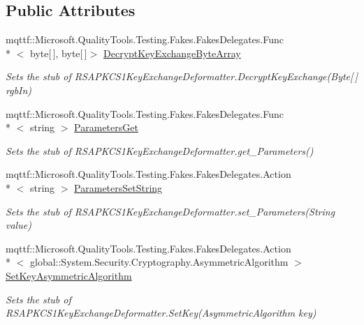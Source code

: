 \subsection*{Public Attributes}
\begin{DoxyCompactItemize}
\item 
mqttf\-::\-Microsoft.\-Quality\-Tools.\-Testing.\-Fakes.\-Fakes\-Delegates.\-Func\\*
$<$ byte\mbox{[}$\,$\mbox{]}, byte\mbox{[}$\,$\mbox{]}$>$ \hyperlink{class_system_1_1_security_1_1_cryptography_1_1_fakes_1_1_stub_r_s_a_p_k_c_s1_key_exchange_deformatter_ad2425a4b2fac6c6d558abbca82806171}{Decrypt\-Key\-Exchange\-Byte\-Array}
\begin{DoxyCompactList}\small\item\em Sets the stub of R\-S\-A\-P\-K\-C\-S1\-Key\-Exchange\-Deformatter.\-Decrypt\-Key\-Exchange(\-Byte\mbox{[}$\,$\mbox{]} rgb\-In)\end{DoxyCompactList}\item 
mqttf\-::\-Microsoft.\-Quality\-Tools.\-Testing.\-Fakes.\-Fakes\-Delegates.\-Func\\*
$<$ string $>$ \hyperlink{class_system_1_1_security_1_1_cryptography_1_1_fakes_1_1_stub_r_s_a_p_k_c_s1_key_exchange_deformatter_a96a1db2d38059f466a4d8e49efa3334b}{Parameters\-Get}
\begin{DoxyCompactList}\small\item\em Sets the stub of R\-S\-A\-P\-K\-C\-S1\-Key\-Exchange\-Deformatter.\-get\-\_\-\-Parameters()\end{DoxyCompactList}\item 
mqttf\-::\-Microsoft.\-Quality\-Tools.\-Testing.\-Fakes.\-Fakes\-Delegates.\-Action\\*
$<$ string $>$ \hyperlink{class_system_1_1_security_1_1_cryptography_1_1_fakes_1_1_stub_r_s_a_p_k_c_s1_key_exchange_deformatter_a0a1baf42d89b08385e528670f7985ce9}{Parameters\-Set\-String}
\begin{DoxyCompactList}\small\item\em Sets the stub of R\-S\-A\-P\-K\-C\-S1\-Key\-Exchange\-Deformatter.\-set\-\_\-\-Parameters(\-String value)\end{DoxyCompactList}\item 
mqttf\-::\-Microsoft.\-Quality\-Tools.\-Testing.\-Fakes.\-Fakes\-Delegates.\-Action\\*
$<$ global\-::\-System.\-Security.\-Cryptography.\-Asymmetric\-Algorithm $>$ \hyperlink{class_system_1_1_security_1_1_cryptography_1_1_fakes_1_1_stub_r_s_a_p_k_c_s1_key_exchange_deformatter_ae3e9687ec50930ebe78f81160ca7ef70}{Set\-Key\-Asymmetric\-Algorithm}
\begin{DoxyCompactList}\small\item\em Sets the stub of R\-S\-A\-P\-K\-C\-S1\-Key\-Exchange\-Deformatter.\-Set\-Key(\-Asymmetric\-Algorithm key)\end{DoxyCompactList}\end{DoxyCompactItemize}
